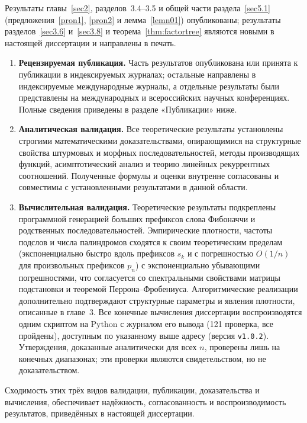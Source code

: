 \documentclass[a4paper,14pt]{extreport}
\theoremstyle{plain}
\theoremstyle{definition}
\theoremstyle{remark}
\begin{document}
	Результаты главы~\ref{sec2}, разделов~3.4--3.5 и общей части раздела~\ref{sec5.1} (предложения~\ref{pron1}, \ref{pron2} и лемма~\ref{lemn01}) опубликованы; результаты разделов~\ref{sec3.6} и~\ref{sec3.8} и теорема~\ref{thm:factortree} являются новыми в настоящей диссертации и направлены в печать.
	
	\begin{enumerate}
		
		\item \textbf{Рецензируемая публикация.} Часть результатов опубликована или принята к публикации в индексируемых журналах; остальные направлены в индексируемые международные журналы, а отдельные результаты были представлены на международных и всероссийских научных конференциях. Полные сведения приведены в разделе «Публикации» ниже.
		
		\item \textbf{Аналитическая валидация.} Все теоретические результаты
		установлены строгими математическими доказательствами, опирающимися на структурные свойства штурмовых и морфных последовательностей, методы производящих функций, асимптотический анализ и теорию линейных рекуррентных соотношений. Полученные формулы и оценки внутренне согласованы и совместимы с установленными результатами в данной области.
		
		\item \textbf{Вычислительная валидация.} Теоретические результаты
		подкреплены программной генерацией больших префиксов слова Фибоначчи и родственных последовательностей. Эмпирические плотности, частоты подслов и числа палиндромов сходятся к своим теоретическим пределам (экспоненциально быстро вдоль префиксов $s_k$ и с погрешностью $O(1/n)$ для произвольных префиксов $p_n$) с экспоненциально убывающими погрешностями, что согласуется со спектральными свойствами матрицы подстановки и теоремой Перрона--Фробениуса.
		Алгоритмические реализации дополнительно подтверждают структурные параметры и явления плотности, описанные в главе~3. 
		Все конечные вычисления диссертации воспроизводятся одним скриптом на Python с журналом его вывода (121 проверка, все пройдены), доступным по указанному выше адресу (версия \texttt{v1.0.2}). Утверждения, доказанные аналитически для всех $n$, проверены лишь на конечных диапазонах; эти проверки являются свидетельством, но не доказательством.
		
	\end{enumerate}
	
	Сходимость этих трёх видов валидации, публикации, доказательства и вычисления, обеспечивает надёжность, согласованность и воспроизводимость результатов, приведённых в настоящей диссертации.
\end{document}
